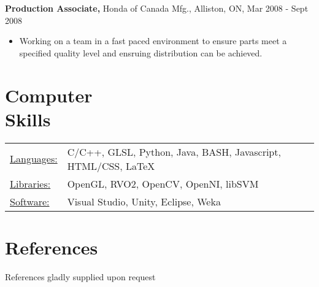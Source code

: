 \documentclass[margin]{res}
\begin{document}
\begin{resume}
	{\bf Production Associate,} Honda of Canada Mfg., Alliston, ON, \hfill Mar 2008 - Sept 2008
	\begin{itemize} \itemsep -2pt
	\item Working on a team in a fast paced environment to ensure parts meet a specified quality level and ensruing distribution can be achieved.
	\end{itemize}
 

\section{Computer \\ Skills}
   \begin{tabular}{l p{3in}}
    \underline{Languages:} & C/C++, GLSL, Python, Java, BASH,  Javascript, HTML/CSS, LaTeX\\
    \underline{Libraries:} & OpenGL, RVO2, OpenCV, OpenNI, libSVM\\
    \underline{Software:} & Visual Studio, Unity, Eclipse, Weka \\
 \end{tabular}

\section{References}
	References gladly supplied upon request

\end{resume} 
\end{document}
